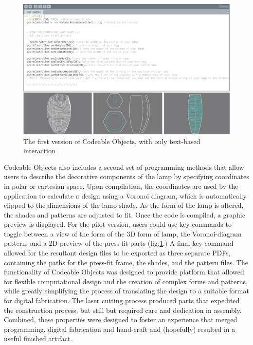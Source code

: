 \begin{center}
\begin{figure}[h!]
\includegraphics[width=\columnwidth]{images/codeable_objects_v1.jpg}
\caption{The first version of Codeable Objects, with only text-based interaction}
\label{fig:codeable_objects_v1}
\end{figure}
\end{center}
\vspace{-20pt}

Codeable Objects also includes a second set of programming methods that allow users to describe the  decorative components of the lamp by specifying coordinates in polar or cartesian space. Upon compilation, the coordinates are used by the application to calculate a design using a Voronoi diagram, which is automatically clipped to the dimensions of the lamp shade. As the form of the lamp is altered, the shades and patterns are adjusted to fit. Once the code is compiled, a graphic preview is displayed. For the pilot version, users could use key-commands to toggle between a view of the form of the 3D form of lamp, the Voronoi-diagram pattern, and a 2D preview of the press fit parts (fig:\ref{fig:codeable_objects_v1}.) A final key-command allowed for the resultant design files to be exported as three separate PDFs, containing the paths for the press-fit frame, the shades, and the pattern files. The functionality of Codeable Objects was designed to provide platform that allowed for flexible computational design and the creation of complex forms and patterns, while greatly simplifying the process of translating the design to a suitable format for digital fabrication. The laser cutting process produced parts that expedited the construction process, but still but required care and dedication in assembly. Combined, these properties were designed to foster an experience that merged programming, digital fabrication and hand-craft and (hopefully) resulted in a useful finished artifact.
		
